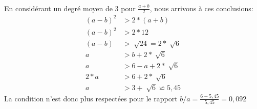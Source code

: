 \paragraph*{}
En considérant un degré moyen de 3 pour $\frac{a+b}{2}$, nous arrivons à ces conclusions:
\begin{align*}
    (a-b)^2 &> 2*(a+b)\\
    (a-b)^2 &> 2*12\\
    (a-b)&>\sqrt[]{24}=2*\sqrt[]{6}\\
    a&>b+2*\sqrt[]{6}\\
    a&>6-a+2*\sqrt[]{6}\\
    2*a&>6+2*\sqrt[]{6}\\
    a&>3+\sqrt[]{6}\backsimeq 5,45
\end{align*}
La condition n'est donc plus respectées pour le rapport $b/a = \frac{6-5,45}{5,45}= 0,092$